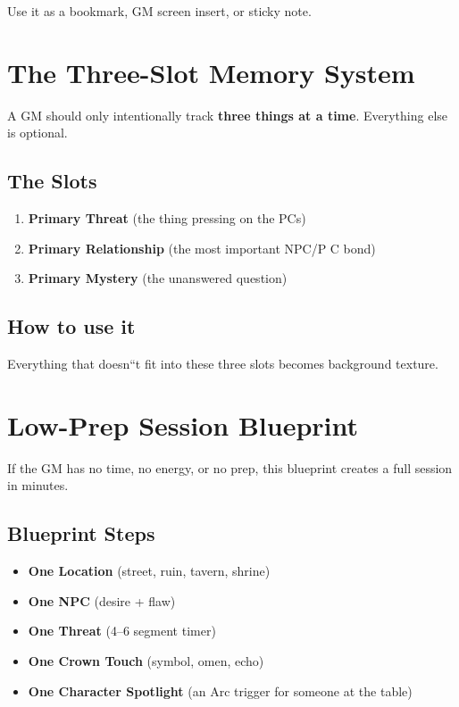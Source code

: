 \documentclass[11pt]{article}
\begin{document}
Use it as a bookmark, GM screen insert, or sticky note.


\section{The Three-Slot Memory System}
\label{appendix:three-slot}

A GM should only intentionally track \textbf{three things at a time}. Everything else is optional.

\subsection{The Slots}

\begin{enumerate}
    \item \textbf{Primary Threat} (the thing pressing on the PCs)
    \item \textbf{Primary Relationship} (the most important NPC/P C bond)
    \item \textbf{Primary Mystery} (the unanswered question)
\end{enumerate}

\subsection{How to use it}
Everything that doesn``t fit into these three slots becomes background texture.


\section{Low-Prep Session Blueprint}
\label{appendix:lowprep}

If the GM has no time, no energy, or no prep, this blueprint creates a full session in minutes.

\subsection{Blueprint Steps}

\begin{itemize}
    \item \textbf{One Location} (street, ruin, tavern, shrine)
    \item \textbf{One NPC} (desire + flaw)
    \item \textbf{One Threat} (4--6 segment timer)
    \item \textbf{One Crown Touch} (symbol, omen, echo)
    \item \textbf{One Character Spotlight} (an Arc trigger for someone at the table)
\end{itemize}
\end{document}
